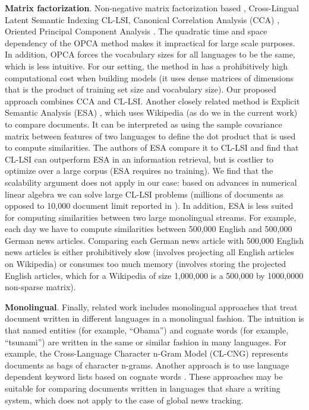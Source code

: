 \documentclass[twoside,11pt]{article}
\begin{document}
\textbf{Matrix factorization}. Non-negative matrix factorization based \cite{nonnegfactor_lsi}, Cross-Lingual Latent Semantic Indexing CL-LSI\cite{multilingualBook}, Canonical Correlation Analysis (CCA) \cite{Hotelling}, Oriented Principal Component Analysis \cite{platt2010translingual}. The quadratic time and space dependency of the OPCA method makes it impractical for large scale purposes. In addition, OPCA forces the vocabulary sizes for all languages to be the same, which is less intuitive. For our setting, the method in \cite{nonnegfactor_lsi} has a prohibitively high computational cost when building models (it uses dense matrices of dimensions that is the product of training set size and vocabulary size). Our proposed approach combines CCA and CL-LSI. Another closely related method is Explicit Semantic Analysis (ESA) \cite{ESA}, which uses Wikipedia (as do we in the current work) to compare documents. It can be interpreted as using the sample covariance matrix between features of two languages to define the dot product that is used to compute similarities.
The authors of ESA compare it to CL-LSI and find that CL-LSI can outperform ESA in an information retrieval, but is costlier to optimize over a large corpus (ESA requires no training). We find that the scalability argument does not apply in our case: based on advances in numerical linear algebra we can solve large CL-LSI problems (millions of documents as opposed to 10,000 document limit reported in \cite{ESA}). In addition, ESA is less suited for computing similarities between two large monolingual streams. For example, each day we have to compute similarities between 500,000 English and 500,000 German news articles. Comparing each German news article with 500,000 English news articles is either prohibitively slow (involves projecting all English articles on Wikipedia) or consumes too much memory (involves storing the projected English articles, which for a Wikipedia of size 1,000,000 is a 500,000 by 1000,0000 non-sparse matrix).

\textbf{Monolingual}. Finally, related work includes monolingual approaches that treat document written in different languages in a monolingual fashion. The intuition is that named entities (for example, ``Obama'') and cognate words (for example, ``tsunami'') are written in the same or similar fashion in many languages. For example, the Cross-Language Character n-Gram Model (CL-CNG) \cite{plagiarism} represents documents as bags of character n-grams. Another approach is to use language dependent keyword lists based on cognate words \cite{pouliquen2008story}. These approaches may be suitable for comparing documents written in languages that share a writing system, which does not apply to the case of global news tracking.
\end{document}
